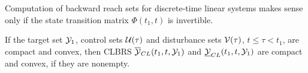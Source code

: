 Computation of backward reach sets for discrete-time linear systems
makes sense only if the state transition matrix $\Phi(t_1, t)$ is invertible.

If the target set $\YY_1$, control sets $\UU(\tau)$ and disturbance
sets $\VV(\tau)$, $t\leq\tau<t_1$, are compact and convex, then 
CLBRS $\OYCL(t_1, t, \YY_1)$ and $\UYCL(t_1, t, \YY_1)$ are compact and convex, if they are nonempty.


























